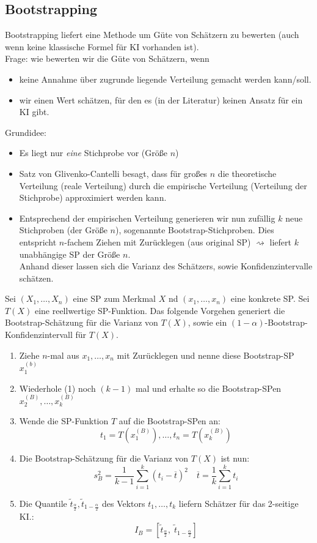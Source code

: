 \subsection{Bootstrapping}
Bootstrapping liefert eine Methode um Güte von Schätzern zu bewerten (auch wenn keine klassische Formel für KI vorhanden ist).\\
Frage: wie bewerten wir die Güte von Schätzern, wenn
\begin{itemize}
\item keine Annahme über zugrunde liegende Verteilung gemacht werden kann/soll.
\item wir einen Wert schätzen, für den es (in der Literatur) keinen Ansatz für ein KI gibt.
\end{itemize}
Grundidee:
\begin{itemize}
\item Es liegt nur \emph{eine} Stichprobe vor (Größe $n$)
\item Satz von Glivenko-Cantelli besagt, dass für großes $n$ die theoretische Verteilung (reale Verteilung) durch die empirische Verteilung (Verteilung der Stichprobe) approximiert werden kann.
\item Entsprechend der empirischen Verteilung generieren wir nun zufällig $k$ neue Stichproben (der Größe $n$), sogenannte Bootstrap-Stichproben. Dies entspricht $n$-fachem Ziehen mit Zurücklegen (aus original SP) $\rightsquigarrow$ liefert $k$ unabhängige SP der Größe $n$.\\
Anhand dieser lassen sich die Varianz des Schätzers, sowie Konfidenzintervalle schätzen.
\end{itemize}

 Sei $(X_1, \ldots, X_n)$ eine SP zum Merkmal $X$ nd $(x_1, \ldots, x_n)$ eine konkrete SP. Sei $T(X)$ eine reellwertige SP-Funktion. Das folgende Vorgehen generiert die Bootstrap-Schätzung für die Varianz von $T(X)$, sowie ein $(1-\alpha)$-Bootstrap-Konfidenzintervall für $T(X)$.
\begin{enumerate}
\item Ziehe $n$-mal aus $x_1, \ldots, x_n$ mit Zurücklegen und nenne diese Bootstrap-SP $x_1^{(b)}$
\item Wiederhole (1) noch $(k-1)$ mal und erhalte so die Bootstrap-SPen $x_2^{(B)}, \ldots ,x_k^{(B)}$
\item Wende die SP-Funktion $T$ auf die Bootstrap-SPen an:
$$t_1=T(x_1^{(B)}), \ldots , t_n=T(x_k^{(B)})$$
\item Die Bootstrap-Schätzung für die Varianz von $T(X)$ ist nun:
$$s_B^2=\frac{1}{k-1}\sum_{i=1}^k (t_i-\overline{t})^2\quad \overline{t}=\frac{1}{k}\sum_{i=1}^k t_i$$
\item Die Quantile $\tilde{t}_{\frac{\alpha}{2}}, \tilde{t}_{1-\frac{\alpha}{2}}$ des Vektors $t_1, \ldots, t_k$ liefern Schätzer für das 2-seitige KI.:
$$I_B=[\tilde{t}_{\frac{\alpha}{2}},\; \tilde{t}_{1-\frac{\alpha}{2}}]$$
\end{enumerate}

